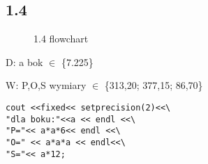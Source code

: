 \documentclass[a4paper,11pt]{article}
\begin{document}
\subsection*{1.4}
\begin{multicols}{2}
  \begin{flushleft}
    \begin{figure}[H]
    \centering  
{}
    \caption{1.4 flowchart}
    \label{flow4}
\end{figure}
    \end{flushleft}
 D: a bok $\in$ \{7.225\} 
 
 W: P,O,S wymiary $\in $ \{313,20; 377,15; 86,70\}
    \begin{flushright}
    \begin{verbatim}
cout <<fixed<< setprecision(2)<<\
"dla boku:"<<a << endl <<\
"P="<< a*a*6<< endl <<\
"O=" << a*a*a << endl<<\
"S="<< a*12;
\end{verbatim}
    \end{flushright}
\end{multicols}
\end{document}
